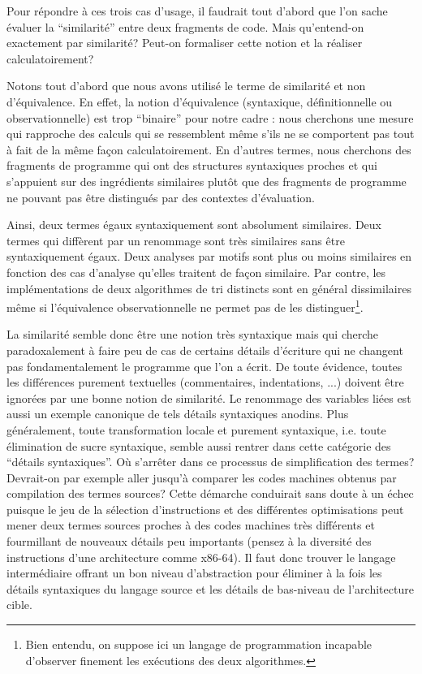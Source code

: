 Pour répondre à ces trois cas d'usage, il faudrait tout d'abord que
l'on sache évaluer la ``similarité'' entre deux fragments de
code. Mais qu'entend-on exactement par similarité? Peut-on
formaliser cette notion et la réaliser calculatoirement?

Notons tout d'abord que nous avons utilisé le terme de similarité et
non d'équivalence. En effet, la notion d'équivalence (syntaxique,
définitionnelle ou observationnelle) est trop ``binaire'' pour notre
cadre : nous cherchons une mesure qui rapproche des calculs qui se
ressemblent même s'ils ne se comportent pas tout à fait de la même
façon calculatoirement. En d'autres termes, nous cherchons des
fragments de programme qui ont des structures syntaxiques proches et
qui s'appuient sur des ingrédients similaires plutôt que des fragments
de programme ne pouvant pas être distingués par des contextes
d'évaluation.

Ainsi, deux termes égaux syntaxiquement sont absolument similaires.
Deux termes qui diffèrent par un renommage sont très similaires sans
être syntaxiquement égaux. Deux analyses par motifs sont plus ou
moins similaires en fonction des cas d'analyse qu'elles traitent
de façon similaire. Par contre, les implémentations de deux
algorithmes de tri distincts sont en général dissimilaires
même si l'équivalence observationnelle ne permet pas de les
distinguer\footnote{Bien entendu, on suppose ici
un langage de programmation incapable d'observer finement
les exécutions des deux algorithmes.}.

La similarité semble donc être une notion très syntaxique mais qui
cherche paradoxalement à faire peu de cas de certains détails
d'écriture qui ne changent pas fondamentalement le programme que l'on
a écrit. De toute évidence, toutes les différences purement textuelles
(commentaires, indentations, ...) doivent être ignorées par une bonne
notion de similarité. Le renommage des variables liées est aussi un
exemple canonique de tels détails syntaxiques anodins. Plus
généralement, toute transformation locale et purement syntaxique,
i.e. toute élimination de sucre syntaxique, semble aussi rentrer dans
cette catégorie des ``détails syntaxiques''. Où s'arrêter dans ce
processus de simplification des termes? Devrait-on par exemple aller
jusqu'à comparer les codes machines obtenus par compilation des termes
sources? Cette démarche conduirait sans doute à un échec puisque le
jeu de la sélection d'instructions et des différentes optimisations
peut mener deux termes sources proches à des codes machines très différents
et fourmillant de nouveaux détails peu importants (pensez à la
diversité des instructions d'une architecture comme x86-64). Il faut
donc trouver le langage intermédiaire offrant un bon niveau
d'abstraction pour éliminer à la fois les détails syntaxiques
du langage source et les détails de bas-niveau de l'architecture cible.

